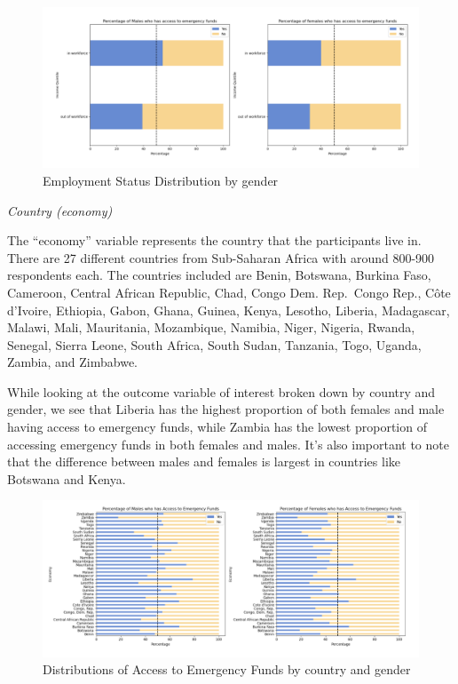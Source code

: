 \documentclass[12pt]{article}
\begin{document}
\begin{figure}

{\centering \includegraphics[width=1.1\linewidth]{graphs/employ_graph9} 

}

\caption{Employment Status  Distribution by gender}\label{fig:unnamed-chunk-10}
\end{figure}

\emph{Country (economy)}

The ``economy'' variable represents the country that the participants
live in. There are 27 different countries from Sub-Saharan Africa with
around 800-900 respondents each. The countries included are Benin,
Botswana, Burkina Faso, Cameroon, Central African Republic, Chad, Congo
Dem. Rep.~Congo Rep., Côte d'Ivoire, Ethiopia, Gabon, Ghana, Guinea,
Kenya, Lesotho, Liberia, Madagascar, Malawi, Mali, Mauritania,
Mozambique, Namibia, Niger, Nigeria, Rwanda, Senegal, Sierra Leone,
South Africa, South Sudan, Tanzania, Togo, Uganda, Zambia, and Zimbabwe.

While looking at the outcome variable of interest broken down by country
and gender, we see that Liberia has the highest proportion of both
females and male having access to emergency funds, while Zambia has the
lowest proportion of accessing emergency funds in both females and
males. It's also important to note that the difference between males and
females is largest in countries like Botswana and Kenya.

\begin{figure}

{\centering \includegraphics[width=1.1\linewidth]{graphs/country_graph10} 

}

\caption{Distributions of Access to Emergency Funds by country and gender}\label{fig:unnamed-chunk-11}
\end{figure}
\end{document}
